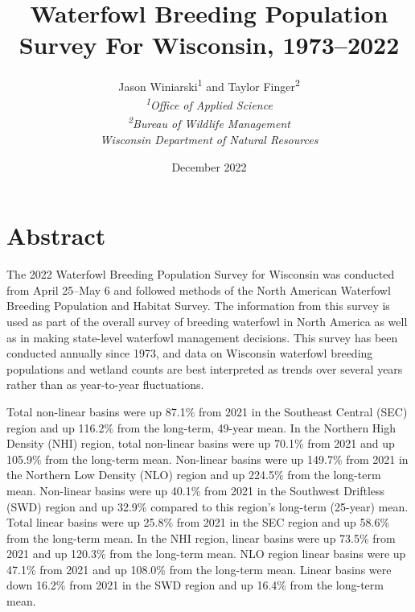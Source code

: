 \documentclass[
  12pt,
]{article}
\title{Waterfowl Breeding Population Survey For Wisconsin, 1973--2022}
\author{Jason Winiarski\textsuperscript{1} and Taylor
Finger\textsuperscript{2}\\
\emph{\textsuperscript{1}Office of Applied Science}\\
\emph{\textsuperscript{2}Bureau of Wildlife Management}\\
\emph{Wisconsin Department of Natural Resources}}
\date{December 2022}
\begin{document}
\maketitle

{
\hypersetup{linkcolor=}
\setcounter{tocdepth}{3}
\tableofcontents
}
\newpage

\hypertarget{abstract}{%
\section{Abstract}\label{abstract}}

The 2022 Waterfowl Breeding Population Survey for Wisconsin was
conducted from April 25--May 6 and followed methods of the North
American Waterfowl Breeding Population and Habitat Survey. The
information from this survey is used as part of the overall survey of
breeding waterfowl in North America as well as in making state-level
waterfowl management decisions. This survey has been conducted annually
since 1973, and data on Wisconsin waterfowl breeding populations and
wetland counts are best interpreted as trends over several years rather
than as year-to-year fluctuations.

Total non-linear basins were up 87.1\% from 2021 in the Southeast
Central (SEC) region and up 116.2\% from the long-term, 49-year mean. In
the Northern High Density (NHI) region, total non-linear basins were up
70.1\% from 2021 and up 105.9\% from the long-term mean. Non-linear
basins were up 149.7\% from 2021 in the Northern Low Density (NLO)
region and up 224.5\% from the long-term mean. Non-linear basins were up
40.1\% from 2021 in the Southwest Driftless (SWD) region and up 32.9\%
compared to this region's long-term (25-year) mean. Total linear basins
were up 25.8\% from 2021 in the SEC region and up 58.6\% from the
long-term mean. In the NHI region, linear basins were up 73.5\% from
2021 and up 120.3\% from the long-term mean. NLO region linear basins
were up 47.1\% from 2021 and up 108.0\% from the long-term mean. Linear
basins were down 16.2\% from 2021 in the SWD region and up 16.4\% from
the long-term mean.
\end{document}
